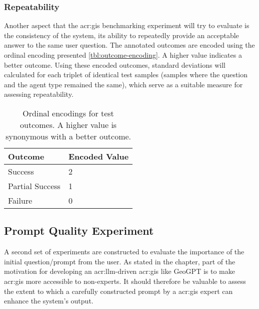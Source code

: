 \subsubsection{Repeatability}
\label{subsubsec:repeatability}

Another aspect that the \acrshort{acr:gis} benchmarking experiment will try to evaluate is the consistency of the system, its ability to repeatedly provide an acceptable answer to the same user question. The annotated outcomes are encoded using the ordinal encoding presented \autoref{tbl:outcome-encoding}. A higher value indicates a better outcome. Using these encoded outcomes, standard deviations will calculated for each triplet of identical test samples (samples where the question and the agent type remained the same), which serve as a suitable measure for assessing repeatability.

\begin{table}[htbp]
    \centering
    \caption[Ordinal encodings for test outcomes]{Ordinal encodings for test outcomes. A higher value is synonymous with a better outcome.}
    \label{tbl:outcome-encoding}
    \begin{tabularx}{0.5\textwidth}{XX}
        \toprule
        \textbf{Outcome} & \textbf{Encoded Value} \\
        \midrule
        Success          & 2                      \\
        Partial Success  & 1                      \\
        Failure          & 0                      \\
        \bottomrule
    \end{tabularx}
\end{table}


\subsection{Prompt Quality Experiment}
\label{subsec:prompt-quality-test-setup}

A second set of experiments are constructed to evaluate the importance of the initial question/prompt from the user. As stated in the  chapter, part of the motivation for developing an \acrshort{acr:llm}-driven \acrshort{acr:gis} like GeoGPT is to make \acrshort{acr:gis} more accessible to non-experts. It should therefore be valuable to assess the extent to which a carefully constructed prompt by a \acrshort{acr:gis} expert can enhance the system's output.

